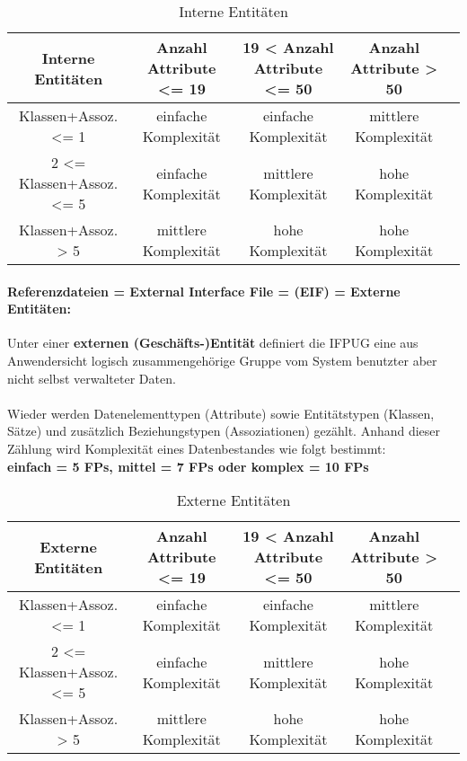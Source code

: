\begin{table}
	\centering
	\begin{tabular}{||c | c | c | c | c ||} 
		\hline
		\textbf{Interne Entitäten} & Anzahl Attribute <= 19 & 19 < Anzahl Attribute <= 50 & Anzahl Attribute > 50 \\  
		\hline\hline
		Klassen+Assoz. <= 1 & einfache Komplexität & einfache Komplexität & mittlere Komplexität \\ 
		\hline
		2 <= Klassen+Assoz. <= 5 & einfache Komplexität & mittlere Komplexität & hohe Komplexität \\ 
		\hline
		Klassen+Assoz. > 5 & mittlere Komplexität & hohe Komplexität & hohe Komplexität \\ 
		\hline
	\end{tabular}
	\caption{Interne Entitäten}
\end{table}

\paragraph{Referenzdateien = External Interface File = (EIF) = Externe Entitäten:}
Unter einer \textbf{externen (Geschäfts-)Entität} definiert die IFPUG eine aus Anwendersicht logisch zusammengehörige Gruppe vom System benutzter aber nicht selbst verwalteter Daten.
\\
\\
Wieder werden Datenelementtypen (Attribute) sowie Entitätstypen (Klassen, Sätze) und zusätzlich Beziehungstypen (Assoziationen) gezählt. Anhand  dieser Zählung wird Komplexität eines Datenbestandes wie folgt bestimmt: \\
\textbf{einfach = 5 FPs, mittel = 7 FPs oder komplex = 10 FPs}

\begin{table}
	\centering
	\begin{tabular}{||c | c | c | c | c ||} 
		\hline
		\textbf{Externe Entitäten} & Anzahl Attribute <= 19 & 19 < Anzahl Attribute <= 50 & Anzahl Attribute > 50 \\  
		\hline\hline
		Klassen+Assoz. <= 1 & einfache Komplexität & einfache Komplexität & mittlere Komplexität \\ 
		\hline
		2 <= Klassen+Assoz. <= 5 & einfache Komplexität & mittlere Komplexität & hohe Komplexität \\ 
		\hline
		Klassen+Assoz. > 5 & mittlere Komplexität & hohe Komplexität & hohe Komplexität \\ 
		\hline
	\end{tabular}
	\caption{Externe Entitäten}
\end{table}

